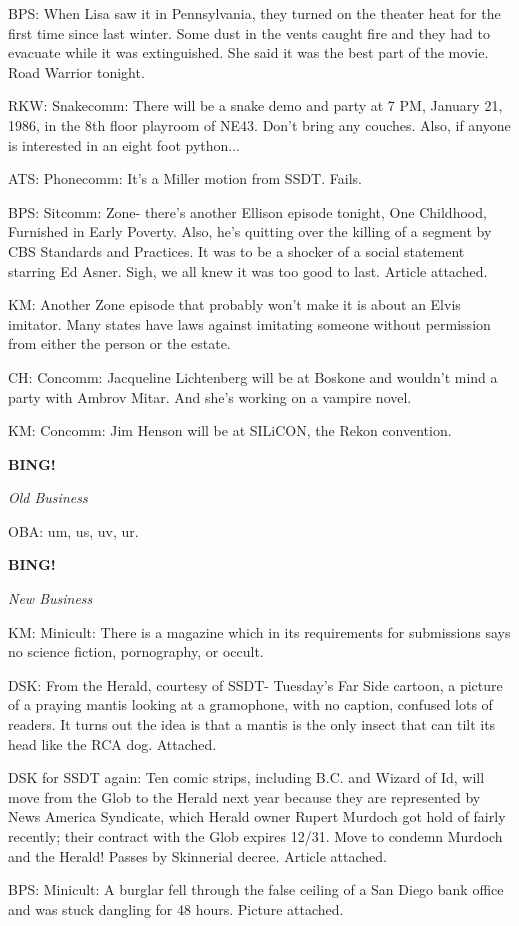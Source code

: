 \documentclass[12pt]{article}
\newcommand{\bing}{{\bf BING!} }
\newcommand{\goto}[1]{\bing \vskip 12pt \centerline{{\em{#1}}}}
\begin{document}
BPS: When Lisa saw it in Pennsylvania, they turned on the theater heat for the first time since last winter. Some dust in the vents caught fire and they had to evacuate while it was extinguished. She said it was the best part of the movie. Road Warrior tonight.

RKW: Snakecomm: There will be a snake demo and party at 7 PM, January 21, 1986, in the 8th floor playroom of NE43. Don't bring any couches. Also, if anyone is interested in an eight foot python...

ATS: Phonecomm: It's a Miller motion from SSDT. Fails.

BPS: Sitcomm: Zone- there's another Ellison episode tonight, One Childhood, Furnished in Early Poverty. Also, he's quitting over the killing of a segment by CBS Standards and Practices. It was to be a shocker of a social statement starring Ed Asner. Sigh, we all knew it was too good to last. Article attached.

KM: Another Zone episode that probably won't make it is about an Elvis imitator. Many states have laws against imitating someone without permission from either the person or the estate.

CH: Concomm: Jacqueline Lichtenberg will be at Boskone and wouldn't mind a party with Ambrov Mitar. And she's working on a vampire novel.

KM: Concomm: Jim Henson will be at SILiCON, the Rekon convention.

\goto{Old Business}

OBA: um, us, uv, ur.

\goto{New Business}

KM: Minicult: There is a magazine which in its requirements for submissions says no science fiction, pornography, or occult.

DSK: From the Herald, courtesy of SSDT- Tuesday's Far Side cartoon, a picture of a praying mantis looking at a gramophone, with no caption, confused lots of readers. It turns out the idea is that a mantis is the only insect that can tilt its head like the RCA dog. Attached.

DSK for SSDT again: Ten comic strips, including B.C. and Wizard of Id, will move from the Glob to the Herald next year because they are represented by News America Syndicate, which Herald owner Rupert Murdoch got hold of fairly recently; their contract with the Glob expires 12/31. Move to condemn Murdoch and the Herald! Passes by Skinnerial decree. Article attached.

BPS: Minicult: A burglar fell through the false ceiling of a San Diego bank office and was stuck dangling for 48 hours. Picture attached.
\end{document}
